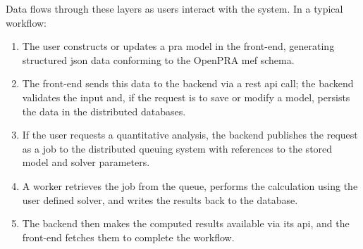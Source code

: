 Data flows through these layers as users interact with the system. In a typical workflow:
\begin{enumerate}
\item The user constructs or updates a \acrshort{pra} model in the front-end, generating structured \acrshort{json} data conforming to the OpenPRA \acrshort{mef} schema.
\item The front-end sends this data to the backend via a \acrshort{rest} \acrshort{api} call; the backend validates the input and, if the request is to save or modify a model, persists the data in the distributed databases.
\item If the user requests a quantitative analysis, the backend publishes the request as a job to the distributed queuing system with references to the stored model and solver parameters.
\item A worker retrieves the job from the queue, performs the calculation using the user defined solver, and writes the results back to the database.
\item The backend then makes the computed results available via its \acrshort{api}, and the front-end fetches them to complete the workflow.
\end{enumerate}



